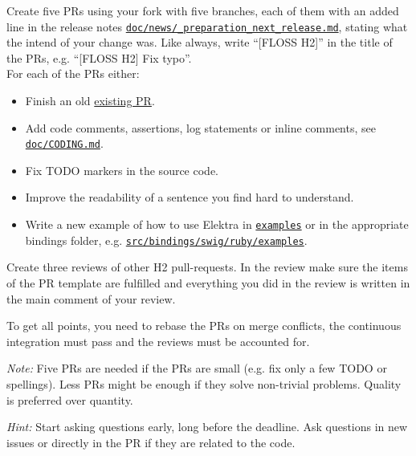 \documentclass[11pt,a4paper]{article}
\begin{document}
Create five PRs using your fork with five branches, each of them with an added line in the release notes \href{https://master.libelektra.org/doc/news/_preparation_next_release.md}{\texttt{doc/news/\_preparation\_next\_release.md}}, stating what the intend of your change was.
Like always, write ``[FLOSS H2]'' in the title of the PRs, e.g. ``[FLOSS H2] Fix typo''.\\
For each of the PRs either:
\begin{itemize}
\item Finish an old \href{https://pulls.libelektra.org}{existing PR}.

\item Add code comments, assertions, log statements or inline comments, see \href{https://master.libelektra.org/doc/CODING.md}{\texttt{doc/CODING.md}}.

\item Fix TODO markers in the source code.

\item Improve the readability of a sentence you find hard to understand.


\item Write a new example of how to use Elektra in \href{https://master.libelektra.org/examples}{\texttt{examples}} or in the appropriate bindings folder, e.g. \href{https://master.libelektra.org/src/bindings/swig/ruby/examples}{\texttt{src/bindings/swig/ruby/examples}}.
\end{itemize}

Create three reviews of other H2 pull-requests.
In the review make sure the items of the PR template are fulfilled
and everything you did in the review is written in the main comment of your review.

To get all points,
you need to rebase the PRs on merge conflicts,
the continuous integration must pass and
the reviews must be accounted for.

\textit{Note:} Five PRs are needed if the PRs are small (e.g. fix only a few TODO or spellings).
Less PRs might be enough if they solve non-trivial problems.
Quality is preferred over quantity.

\textit{Hint:}
Start asking questions early, long before the deadline.
Ask questions in new issues or directly in the PR if they are related to the code.
\end{document}
